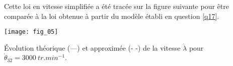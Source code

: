 Cette loi en vitesse simplifiée a été tracée sur la figure suivante pour être comparée à la loi obtenue à
partir du modèle établi en question \ref{q17}.

\begin{marginfigure}
\texttt{[image: fig\_05]}

\caption{Évolution théorique (---) et approximée (- -) de la vitesse  $\dot{\lambda}$ pour $\dot{\theta}_{32}=\SI{3000}{tr.min^{-1}}$.}
\end{marginfigure}


\ifprof
\begin{corrige}
\end{corrige}
\else
\fi
